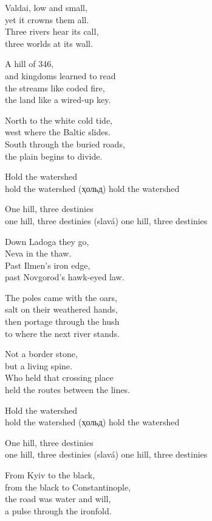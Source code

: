 \begin{lyrics}
Valdai, low and small,\\
yet it crowns them all.\\
Three rivers hear its call,\\
three worlds at its wall.

A hill of 346,\\
and kingdoms learned to read\\
the streams like coded fire,\\
the land like a wired-up key.

North to the white cold tide,\\
west where the Baltic slides.\\
South through the buried roads,\\
the plain begins to divide.

Hold the watershed\\
hold the watershed
(ҳольд) hold the watershed

One hill, three destinies\\
one hill, three destinies
(slavá) one hill, three destinies

Down Ladoga they go,\\
Neva in the thaw.\\
Past Ilmen’s iron edge,\\
past Novgorod’s hawk-eyed law.

The poles came with the oars,\\
salt on their weathered hands,\\
then portage through the hush\\
to where the next river stands.

Not a border stone,\\
but a living spine.\\
Who held that crossing place\\
held the routes between the lines.

Hold the watershed\\
hold the watershed
(ҳольд) hold the watershed

One hill, three destinies\\
one hill, three destinies
(slavá) one hill, three destinies

From Kyiv to the black,\\
from the black to Constantinople,\\
the road was water and will,\\
a pulse through the ironfold.


\end{lyrics}
